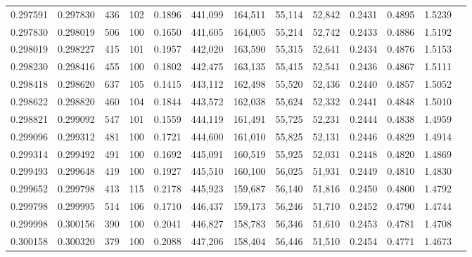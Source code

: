 \begin{tabular}{rrrrrrrrrrrrr}
0.297591 & 0.297830 &   436 & 102 &                                     0.1896 & 441,099 & 164,511 &  55,114 &  52,842 & 0.2431 & 0.4895 & 1.5239 \\
0.297830 & 0.298019 &   506 & 100 &                                     0.1650 & 441,605 & 164,005 &  55,214 &  52,742 & 0.2433 & 0.4886 & 1.5192 \\
0.298019 & 0.298227 &   415 & 101 &                                     0.1957 & 442,020 & 163,590 &  55,315 &  52,641 & 0.2434 & 0.4876 & 1.5153 \\
0.298230 & 0.298416 &   455 & 100 &                                     0.1802 & 442,475 & 163,135 &  55,415 &  52,541 & 0.2436 & 0.4867 & 1.5111 \\
0.298418 & 0.298620 &   637 & 105 &                                     0.1415 & 443,112 & 162,498 &  55,520 &  52,436 & 0.2440 & 0.4857 & 1.5052 \\
0.298622 & 0.298820 &   460 & 104 &                                     0.1844 & 443,572 & 162,038 &  55,624 &  52,332 & 0.2441 & 0.4848 & 1.5010 \\
0.298821 & 0.299092 &   547 & 101 &                                     0.1559 & 444,119 & 161,491 &  55,725 &  52,231 & 0.2444 & 0.4838 & 1.4959 \\
0.299096 & 0.299312 &   481 & 100 &                                     0.1721 & 444,600 & 161,010 &  55,825 &  52,131 & 0.2446 & 0.4829 & 1.4914 \\
0.299314 & 0.299492 &   491 & 100 &                                     0.1692 & 445,091 & 160,519 &  55,925 &  52,031 & 0.2448 & 0.4820 & 1.4869 \\
0.299493 & 0.299648 &   419 & 100 &                                     0.1927 & 445,510 & 160,100 &  56,025 &  51,931 & 0.2449 & 0.4810 & 1.4830 \\
0.299652 & 0.299798 &   413 & 115 &                                     0.2178 & 445,923 & 159,687 &  56,140 &  51,816 & 0.2450 & 0.4800 & 1.4792 \\
0.299798 & 0.299995 &   514 & 106 &                                     0.1710 & 446,437 & 159,173 &  56,246 &  51,710 & 0.2452 & 0.4790 & 1.4744 \\
0.299998 & 0.300156 &   390 & 100 &                                     0.2041 & 446,827 & 158,783 &  56,346 &  51,610 & 0.2453 & 0.4781 & 1.4708 \\
0.300158 & 0.300320 &   379 & 100 &                                     0.2088 & 447,206 & 158,404 &  56,446 &  51,510 & 0.2454 & 0.4771 & 1.4673 \\

\end{tabular}

